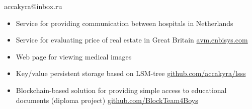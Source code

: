 \documentclass[]{cv-style}
\begin{document}

\begin{aside}
{\color{white} \LARGE accakyra@inbox.ru}
\end{aside}

\vspace{7.9cm}



\vspace{0.7cm}


{\Large{}}
{}

\begin{itemize}
    \item {\large {Service for providing communication between hospitals in Netherlands}}
    \item {\large {Service for evaluating price of real estate in Great     Britain \url{avm.enbisys.com}}}
    \item {\large Web page for viewing medical images}
\end{itemize}

{\small\makebox[0.2\linewidth][l]{\faCalendar\hspace{0.5em}{2018 November -- 2020 July}}}

\vspace{0.7cm}


\begin{itemize}
    \item {\large {Key/value persistent storage based on LSM-tree \href{https://github.com/accakyra/lsss}{github.com/accakyra/lsss}}}
    \item {\large {Blockchain-based solution for providing simple access to educational documents
    \hfill \break
    (diploma project) \href{https://github.com/BlockTeam4Boys}{github.com/BlockTeam4Boys}}}
\end{itemize}

\vspace{0.5cm}


\vspace{0.7cm}



\vspace{0.7cm}
\end{document}
